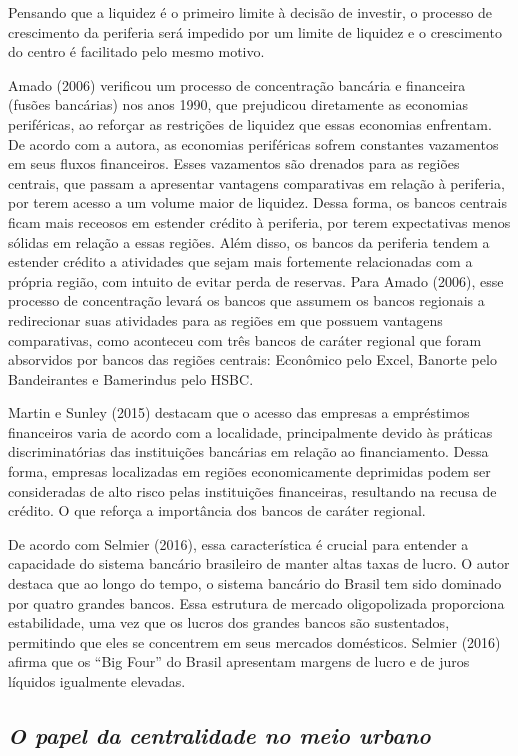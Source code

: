 \documentclass[a4paper,12pt]{article}
\begin{document}
Pensando que a liquidez é o primeiro limite à decisão de investir, o
processo de crescimento da periferia será impedido por um limite de
liquidez e o crescimento do centro é facilitado pelo mesmo motivo.

Amado (2006) verificou um processo de concentração bancária e financeira
(fusões bancárias) nos anos 1990, que prejudicou diretamente as
economias periféricas, ao reforçar as restrições de liquidez que essas
economias enfrentam. De acordo com a autora, as economias periféricas
sofrem constantes vazamentos em seus fluxos financeiros. Esses
vazamentos são drenados para as regiões centrais, que passam a
apresentar vantagens comparativas em relação à periferia, por terem
acesso a um volume maior de liquidez. Dessa forma, os bancos centrais
ficam mais receosos em estender crédito à periferia, por terem
expectativas menos sólidas em relação a essas regiões. Além disso, os
bancos da periferia tendem a estender crédito a atividades que sejam
mais fortemente relacionadas com a própria região, com intuito de evitar
perda de reservas. Para Amado (2006), esse processo de concentração
levará os bancos que assumem os bancos regionais a redirecionar suas
atividades para as regiões em que possuem vantagens comparativas, como
aconteceu com três bancos de caráter regional que foram absorvidos por
bancos das regiões centrais: Econômico pelo Excel, Banorte pelo
Bandeirantes e Bamerindus pelo HSBC.

Martin e Sunley (2015) destacam que o acesso das empresas a empréstimos
financeiros varia de acordo com a localidade, principalmente devido às
práticas discriminatórias das instituições bancárias em relação ao
financiamento. Dessa forma, empresas localizadas em regiões
economicamente deprimidas podem ser consideradas de alto risco pelas
instituições financeiras, resultando na recusa de crédito. O que reforça
a importância dos bancos de caráter regional.

De acordo com Selmier (2016), essa característica é crucial para
entender a capacidade do sistema bancário brasileiro de manter altas
taxas de lucro. O autor destaca que ao longo do tempo, o sistema
bancário do Brasil tem sido dominado por quatro grandes bancos. Essa
estrutura de mercado oligopolizada proporciona estabilidade, uma vez que
os lucros dos grandes bancos são sustentados, permitindo que eles se
concentrem em seus mercados domésticos. Selmier (2016) afirma que os
``Big Four'' do Brasil apresentam margens de lucro e de juros líquidos
igualmente elevadas.

\hypertarget{o-papel-da-centralidade-no-meio-urbano}{%
\subsection{\texorpdfstring{\emph{O papel da centralidade no meio
urbano}}{O papel da centralidade no meio urbano}}\label{o-papel-da-centralidade-no-meio-urbano}}
\end{document}
